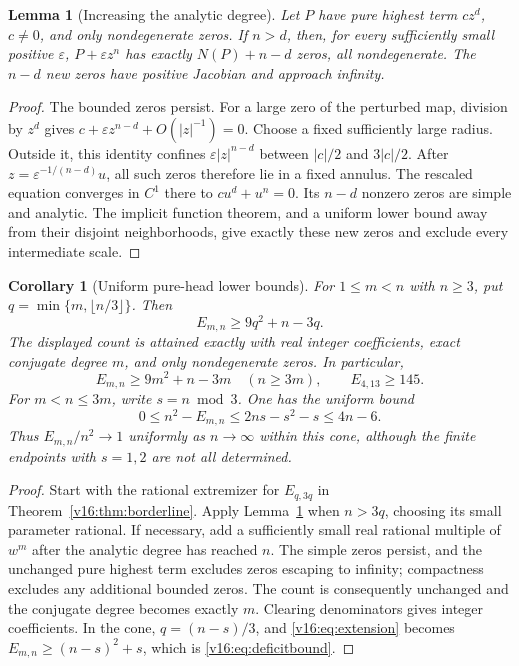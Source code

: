 \documentclass[UTF8,11pt]{ctexart}
\newtheorem{lem}[thm]{Lemma}
\newtheorem{cor}[thm]{Corollary}
\theoremstyle{definition}
\numberwithin{equation}{section}
\begin{document}
\begin{lem}[Increasing the analytic degree]
\label{v16:lem:degreeextension}
Let $P$ have pure highest term $cz^d$, $c\ne0$, and only
nondegenerate zeros. If $n>d$, then, for every sufficiently small
positive $\varepsilon$, $P+\varepsilon z^n$ has exactly
$N(P)+n-d$ zeros, all nondegenerate. The $n-d$ new zeros have
positive Jacobian and approach infinity.
\end{lem}
\begin{proof}
The bounded zeros persist. For a large zero of the perturbed map,
division by $z^d$ gives
$c+\varepsilon z^{n-d}+O(|z|^{-1})=0$.
Choose a fixed sufficiently large radius. Outside it, this identity
confines $\varepsilon |z|^{n-d}$ between $|c|/2$ and $3|c|/2$.
After $z=\varepsilon^{-1/(n-d)}u$, all such zeros therefore lie
in a fixed annulus. The rescaled equation converges in $C^1$ there
to $cu^d+u^n=0$. Its $n-d$ nonzero zeros are simple and analytic.
The implicit function theorem, and a uniform lower bound away from
their disjoint neighborhoods, give exactly these new zeros and
exclude every intermediate scale.
\end{proof}

\begin{cor}[Uniform pure-head lower bounds]
\label{v16:cor:extension}
For $1\le m<n$ with $n\ge3$, put
$q=\min\{m,\lfloor n/3\rfloor\}$. Then
\begin{equation}\label{v16:eq:extension}
 E_{m,n}\ge 9q^2+n-3q.
\end{equation}
The displayed count is attained exactly with real integer
coefficients, exact conjugate degree $m$, and only nondegenerate
zeros. In particular,
\[
 E_{m,n}\ge9m^2+n-3m\quad(n\ge3m),\qquad
 E_{4,13}\ge145.
\]
For $m<n\le3m$, write $s=n\bmod3$. One has the uniform bound
\begin{equation}\label{v16:eq:deficitbound}
 0\le n^2-E_{m,n}\le 2ns-s^2-s\le4n-6.
\end{equation}
Thus $E_{m,n}/n^2\to1$ uniformly as $n\to\infty$ within this
cone, although the finite endpoints with $s=1,2$ are not all
determined.
\end{cor}
\begin{proof}
Start with the rational extremizer for $E_{q,3q}$ in
Theorem~\ref{v16:thm:borderline}. Apply
Lemma~\ref{v16:lem:degreeextension} when $n>3q$, choosing its
small parameter rational. If necessary, add a sufficiently small
real rational multiple of $w^m$ after the analytic degree has
reached $n$. The simple zeros persist, and the unchanged pure
highest term excludes zeros escaping to infinity; compactness
excludes any additional bounded zeros. The count is consequently
unchanged and the conjugate degree becomes exactly $m$.
Clearing denominators gives integer coefficients. In the cone,
$q=(n-s)/3$, and \eqref{v16:eq:extension} becomes
$E_{m,n}\ge(n-s)^2+s$, which is \eqref{v16:eq:deficitbound}.
\end{proof}
\end{document}
